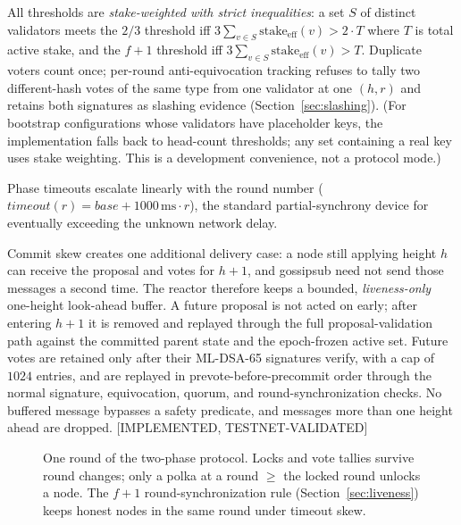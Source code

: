 \documentclass[11pt]{article}
\newcommand{\mldsa}{ML\mbox{-}DSA\mbox{-}65}
\newcommand{\statusV}{\textcolor{statgreen}{\textsf{\scriptsize[IMPLEMENTED, TESTNET-VALIDATED]}}}
\theoremstyle{plain}
\theoremstyle{definition}
\theoremstyle{remark}
\begin{document}
All thresholds are \emph{stake-weighted with strict inequalities}: a set $S$
of distinct validators meets the $2/3$ threshold iff
$3 \sum_{v \in S} \mathrm{stake}_{\mathrm{eff}}(v) > 2 \cdot T$ where $T$ is
total active stake, and the $f{+}1$ threshold iff
$3 \sum_{v \in S} \mathrm{stake}_{\mathrm{eff}}(v) > T$. Duplicate voters
count once; per-round anti-equivocation tracking refuses to tally two
different-hash votes of the same type from one validator at one $(h, r)$ and
retains both signatures as slashing evidence
(Section~\ref{sec:slashing}). (For bootstrap configurations whose validators
have placeholder keys, the implementation falls back to head-count
thresholds; any set containing a real key uses stake weighting. This is a
development convenience, not a protocol mode.)

Phase timeouts escalate linearly with the round number
($\mathit{timeout}(r) = \mathit{base} + 1000\,\mathrm{ms} \cdot r$), the
standard partial-synchrony device for eventually exceeding the unknown
network delay.

Commit skew creates one additional delivery case: a node still applying height
$h$ can receive the proposal and votes for $h{+}1$, and gossipsub need not send
those messages a second time. The reactor therefore keeps a bounded,
\emph{liveness-only} one-height look-ahead buffer. A future proposal is not
acted on early; after entering $h{+}1$ it is removed and replayed through the
full proposal-validation path against the committed parent state and the
epoch-frozen active set. Future votes are retained only after their \mldsa{}
signatures verify, with a cap of $1024$ entries, and are replayed in
prevote-before-precommit order through the normal signature, equivocation,
quorum, and round-synchronization checks. No buffered message bypasses a safety
predicate, and messages more than one height ahead are dropped. \statusV{}

\begin{figure}[ht]\centering
{}%
\caption{One round of the two-phase protocol. Locks and vote tallies survive
round changes; only a polka at a round $\ge$ the locked round unlocks a node.
The $f{+}1$ round-synchronization rule (Section~\ref{sec:liveness}) keeps
honest nodes in the same round under timeout skew.}
\label{fig:consensus}
\end{figure}
\end{document}
